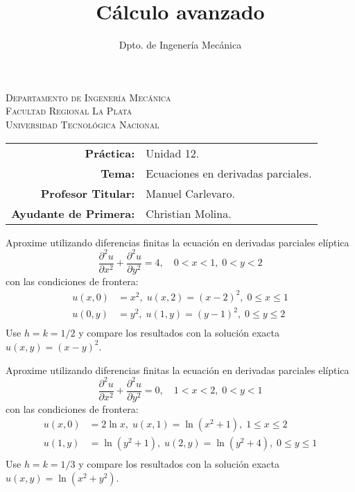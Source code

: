 \documentclass[11pt]{article}
\title{Cálculo avanzado}
\author{Dpto. de Ingenería Mecánica}
\begin{document}

\begin{center}
\end{center} 

\begin{center}
\vspace{\baselineskip}
\Large{\textsc{Departamento de Ingenería Mecánica}} \\
\textsc{Facultad Regional La Plata} \\
\textsc{Universidad Tecnológica Nacional}
\end{center}


\begin{center}
\begin{tabular}{r l}
    \textbf{Práctica:} & Unidad 12. \\
 \textbf{Tema:} & Ecuaciones en derivadas parciales. \\
 \textbf{Profesor Titular:} & Manuel Carlevaro. \\
 \textbf{Ayudante de Primera:} & Christian Molina. \\
\end{tabular}\end{center}

\vspace{1em}

\begin{question} %
Aproxime utilizando diferencias finitas la ecuación en derivadas parciales elíptica
\[ \frac{\partial^2 u}{\partial x^2} +  \frac{\partial^2 u}{\partial y^2} = 4, \quad 0 < x < 1, \; 0 < y < 2 \]
con las condiciones de frontera:
\begin{align*}
    u(x, 0) &= x^2,\; u(x, 2) = (x - 2)^2,\; 0 \leq x \leq 1 \\
    u(0, y) &= y^2,\; u(1, y) = (y - 1)^2,\; 0 \leq y \leq 2 \\
\end{align*}
Use $h = k = 1/2$ y compare los resultados con la solución exacta $u(x, y) = (x - y)^2$.
\end{question}

\begin{question} %
Aproxime utilizando diferencias finitas la ecuación en derivadas parciales elíptica
\[ \frac{\partial^2 u}{\partial x^2} +  \frac{\partial^2 u}{\partial y^2} = 0, \quad 1 < x < 2, \; 0 < y < 1 \]
con las condiciones de frontera:
\begin{align*}
    u(x, 0) &= 2 \ln x,\; u(x, 1) = \ln(x^2 + 1),\; 1 \leq x \leq 2 \\
    u(1, y) &= \ln(y^2 + 1),\; u(2, y) = \ln(y^2 + 4),\; 0 \leq y \leq 1 \\
\end{align*}
Use $h = k = 1/3$ y compare los resultados con la solución exacta $u(x, y) = \ln(x^2 + y^2)$.
\end{question}
\end{document}
